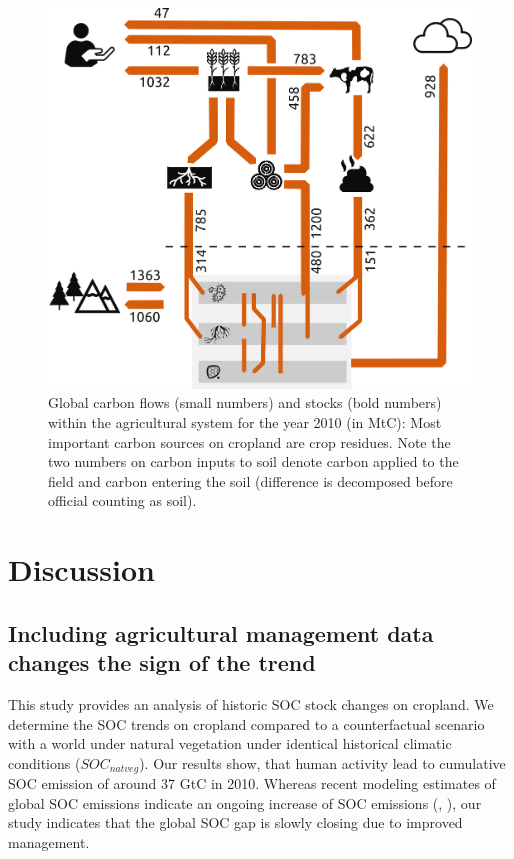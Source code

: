 \documentclass[gc, manuscript]{copernicus}
\begin{document}
\begin{figure}[H]
\includegraphics[width=16cm]{../ResultNotebooks/Output/Images/OuFlowFig} \caption{Global carbon flows (small numbers) and stocks (bold numbers) within the agricultural system for the year 2010 (in MtC): Most important carbon sources on cropland are crop residues. Note the two numbers on carbon inputs to soil denote carbon applied to the field and carbon entering the soil (difference is decomposed before official counting as soil).}\label{fig:FlowFig}
\end{figure}

\newpage

\newpage

\hypertarget{discussion}{%
\section{Discussion}\label{discussion}}

\hypertarget{including-agricultural-management-data-changes-the-sign-of-the-trend}{%
\subsection{Including agricultural management data changes the sign of the trend}\label{including-agricultural-management-data-changes-the-sign-of-the-trend}}

This study provides an analysis of historic SOC stock changes on cropland. We determine the SOC trends on cropland compared to a counterfactual scenario with a world under natural vegetation under identical historical climatic conditions (\(SOC_{natveg}\)). Our results show, that human activity lead to cumulative SOC emission of around 37 GtC in 2010. Whereas recent modeling estimates of global SOC emissions indicate an ongoing increase of SOC emissions (\citep{pugh_simulated_2015}, \citep{sanderman_soil_2017}), our study indicates that the global SOC gap is slowly closing due to improved management.
\end{document}
